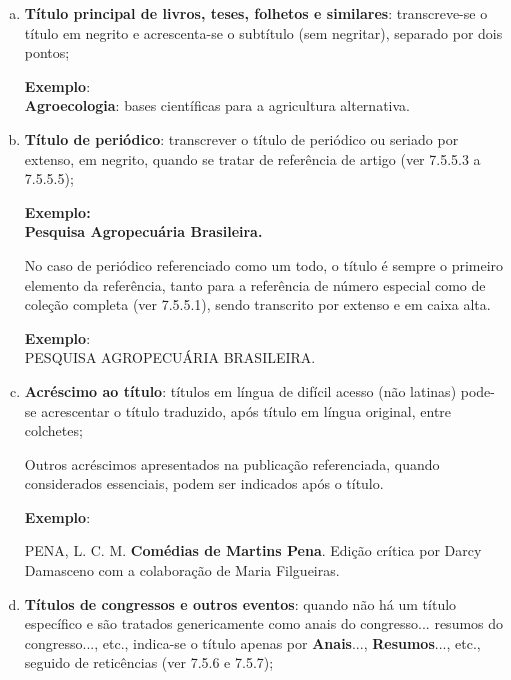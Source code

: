 \begin{enumerate}[a)]
  \item  \textbf{Título principal de livros, teses, folhetos e similares}: transcreve-se o título em negrito e acrescenta-se o subtítulo (sem negritar), separado por dois pontos;

\begin{exemplomanuallista}  
\textbf{Exemplo}:\\
\textbf{Agroecologia}: bases científicas para a agricultura alternativa.
\end{exemplomanuallista}

  \item  \textbf{Título de periódico}: transcrever o título de periódico ou seriado por extenso, em negrito, quando se tratar de referência de artigo (ver 7.5.5.3 a 7.5.5.5);

\begin{exemplomanuallista}  
\textbf{Exemplo:\\
Pesquisa Agropecuária Brasileira.}
\end{exemplomanuallista}  

No caso de periódico referenciado como um todo, o título é sempre o primeiro elemento da referência, tanto para a referência de número especial como de coleção completa (ver 7.5.5.1), sendo transcrito por extenso e em caixa alta.

\begin{exemplomanuallista}
\textbf{Exemplo}:\\
PESQUISA AGROPECUÁRIA BRASILEIRA.
\end{exemplomanuallista}

  \item  \textbf{Acréscimo ao título}: títulos em língua de difícil acesso (não latinas) pode-se acrescentar o título traduzido, após título em língua original, entre colchetes;
  
Outros acréscimos apresentados na publicação referenciada, quando considerados essenciais, podem ser indicados após o título.

\begin{exemplomanuallista}
\textbf{Exemplo}:\\
\begin{singlespace}
PENA, L. C. M. \textbf{Comédias de Martins Pena}. Edição crítica por Darcy Damasceno com a colaboração de Maria Filgueiras.
\end{singlespace}
\end{exemplomanuallista}

  \item  \textbf{Títulos de congressos e outros eventos}: quando não há um título específico e são tratados genericamente como anais do congresso... resumos do congresso..., etc., indica-se o título apenas por \textbf{Anais}...,  \textbf{Resumos}..., etc., seguido de reticências (ver 7.5.6 e 7.5.7);
  

\end{enumerate}
